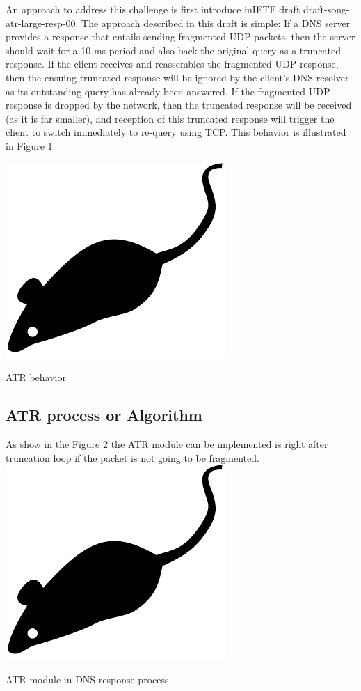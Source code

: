 An approach to address this challenge is first introduce inIETF draft draft-song-atr-large-resp-00. The approach described in this draft is simple: If a DNS server provides a response that entails sending fragmented UDP packets, then the server should wait for a 10 ms period and also back the original query as a truncated response. If the client receives and reassembles the fragmented UDP response, then the ensuing truncated response will be ignored by the client’s DNS resolver as its outstanding query has already been answered. If the fragmented UDP response is dropped by the network, then the truncated response will be received (as it is far smaller), and reception of this truncated response will trigger the client to switch immediately to re-query using TCP. This behavior is illustrated in Figure 1.

\centering
\includegraphics{figures/mouse}
\caption{ATR behavior}


\subsection{ATR process or Algorithm}

As show in the Figure 2 the ATR module can be implemented is right after truncation loop if the packet is not going to be fragmented.
\centering
\includegraphics{figures/mouse}
\caption{ATR module in DNS response process}

